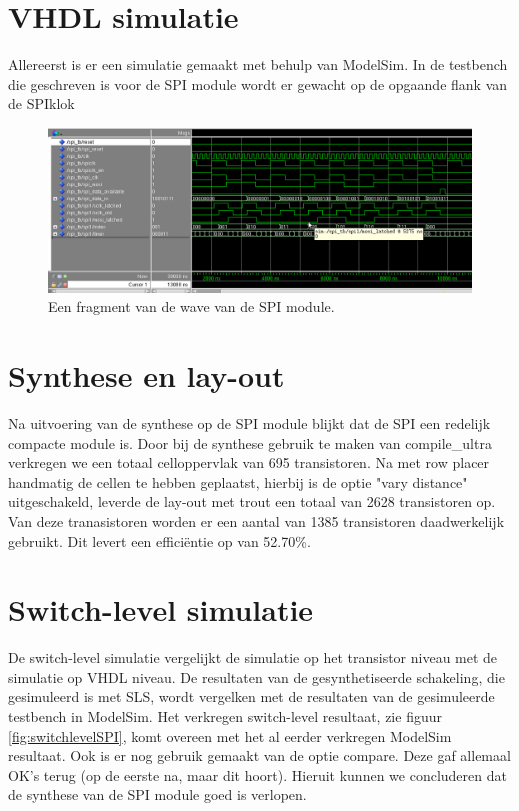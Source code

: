 \documentclass{scrartcl} %
\begin{document}
\section{VHDL simulatie}
Allereerst is er een simulatie gemaakt met behulp van ModelSim. In de testbench die geschreven is voor de SPI module wordt er gewacht op de opgaande flank van de SPIklok
\begin{figure}[H]
	\centering
	\includegraphics[width=\textwidth]{resource/waveSPI2.png}
	\caption{Een fragment van de wave van de SPI module.}
	\label{fig:waveSPI2}
\end{figure}

\section{Synthese en lay-out}
\label{sec:synthese en lay-out} 
Na uitvoering van de synthese op de SPI module blijkt dat de SPI een redelijk compacte module is. Door bij de synthese gebruik te maken van compile\_ultra verkregen we een totaal celloppervlak van 695 transistoren. Na met row placer handmatig de cellen te hebben geplaatst, hierbij is de optie "vary distance" uitgeschakeld, leverde de lay-out met trout een totaal van 2628 transistoren op. Van deze tranasistoren worden er een aantal van 1385 transistoren daadwerkelijk gebruikt. Dit levert een effici\"entie op van 52.70\%.   %

\section{Switch-level simulatie}
De switch-level simulatie vergelijkt de simulatie op het transistor niveau met de simulatie op VHDL niveau. De resultaten van de gesynthetiseerde schakeling, die gesimuleerd is met SLS, wordt vergelken met de resultaten van de gesimuleerde testbench in ModelSim. Het verkregen switch-level resultaat, zie figuur \ref{fig:switchlevelSPI}, komt overeen met het al eerder verkregen ModelSim resultaat. Ook is er nog gebruik gemaakt van de optie compare. Deze gaf allemaal OK's terug (op de eerste na, maar dit hoort). Hieruit kunnen we concluderen dat de synthese van de SPI module goed is verlopen. 
\end{document}
